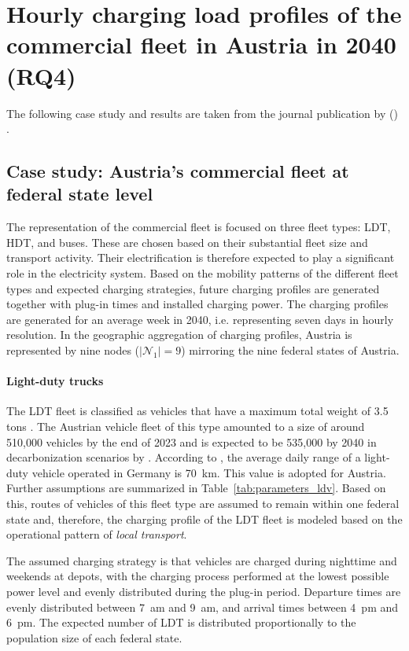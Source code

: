 \section{Hourly charging load profiles of the commercial
fleet in Austria in 2040 (RQ4)}\label{sec:rq4_results}

The following case study and results are taken from the journal publication by \citeauthor{GOLAB2025134385} (\citeyear{GOLAB2025134385}) \cite{GOLAB2025134385}.

\subsection{Case study: Austria's commercial fleet at federal state level}
The representation of the commercial fleet is focused on three fleet types: \ac{LDT}, \ac{HDT}, and buses. These are chosen based on their substantial fleet size and transport activity. Their electrification is therefore expected to play a significant role in the electricity system. Based on the mobility patterns of the different fleet types and expected charging strategies, future charging profiles are generated together with plug-in times and installed charging power. The charging profiles are generated for an average week in 2040, i.e. representing seven days in hourly resolution. In the geographic aggregation of charging profiles, Austria is represented by nine nodes ($|\mathcal{N}_1|=9$) mirroring the nine federal states of Austria.

            \paragraph*{Light-duty trucks}
            The \ac{LDT} fleet is classified as vehicles that have a maximum total weight of 3.5 tons \cite{usp_nutzfahrzeuge}. The Austrian vehicle fleet of this type amounted to a size of around 510,000 vehicles by the end of 2023 and is expected to be 535,000 by 2040 in decarbonization scenarios by \citet{umweltbundesamt_rep0808}. According to \cite{SCORRANO2021101022}, the average daily range of a light-duty vehicle operated in Germany is 70~km. This value is adopted for Austria. Further assumptions are summarized in Table~\ref{tab:parameters_ldv}. Based on this, routes of vehicles of this fleet type are assumed to remain within one federal state and, therefore, the charging profile of the \ac{LDT} fleet is modeled based on the operational pattern of \textit{local transport}. 

            The assumed charging strategy is that vehicles are charged during nighttime and weekends at depots, with the charging process performed at the lowest possible power level and evenly distributed during the plug-in period. Departure times are evenly distributed between 7~am and 9~am, and arrival times between 4~pm and 6~pm. The expected number of \ac{LDT} is distributed proportionally to the population size of each federal state.


